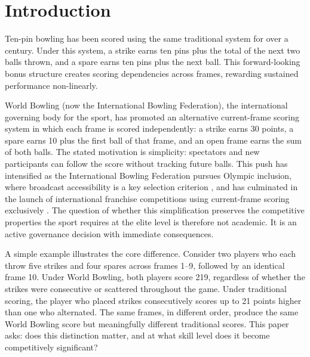 \documentclass[USenglish]{article}
\theoremstyle{dgthm}
\theoremstyle{dgdef}
\begin{document}

\maketitle

\doublespacing

\section{Introduction}

Ten-pin bowling has been scored using the same traditional system for over a century. Under this system, a strike earns ten pins plus the total of the next two balls thrown, and a spare earns ten pins plus the next ball. This forward-looking bonus structure creates scoring dependencies across frames, rewarding sustained performance non-linearly.

World Bowling (now the International Bowling Federation), the international governing body for the sport, has promoted an alternative current-frame scoring system \citep{worldbowling2014} in which each frame is scored independently: a strike earns 30 points, a spare earns 10 plus the first ball of that frame, and an open frame earns the sum of both balls. The stated motivation is simplicity: spectators and new participants can follow the score without tracking future balls. This push has intensified as the International Bowling Federation pursues Olympic inclusion, where broadcast accessibility is a key selection criterion \citep{insidethegames2014}, and has culminated in the launch of international franchise competitions using current-frame scoring exclusively \citep{reuters2025wbl}. The question of whether this simplification preserves the competitive properties the sport requires at the elite level is therefore not academic. It is an active governance decision with immediate consequences.

A simple example illustrates the core difference. Consider two players who each throw five strikes and four spares across frames 1--9, followed by an identical frame 10. Under World Bowling, both players score 219, regardless of whether the strikes were consecutive or scattered throughout the game. Under traditional scoring, the player who placed strikes consecutively scores up to 21 points higher than one who alternated. The same frames, in different order, produce the same World Bowling score but meaningfully different traditional scores. This paper asks: does this distinction matter, and at what skill level does it become competitively significant?
\end{document}
